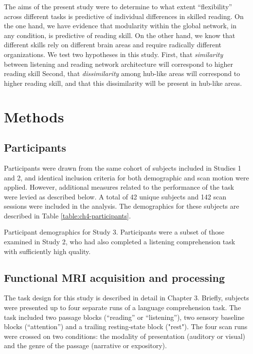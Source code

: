 The aims of the present study were to determine to what extent ``flexibility'' across different tasks is predictive of individual differences in skilled reading. On the one hand, we have evidence that modularity within the global network, in any condition, is predictive of reading skill. On the other hand, we know that different skills rely on different brain areas and require radically different organizations. We test two hypotheses in this study. First, that \textit{similarity} between listening and reading network architecture will correspond to higher reading skill Second, that \textit{dissimilarity} among hub-like areas will correspond to higher reading skill, and that this dissimilarity will be present in hub-like areas. 


\section{Methods}

\subsection{Participants}

Participants were drawn from the same cohort of subjects included in Studies 1 and 2, and identical inclusion criteria for both demographic and scan motion were applied. However, additional measures related to the performance of the task were levied as described below. A total of 42 unique subjects and 142 scan sessions were included in the analysis. The demographics for these subjects are described in Table \ref{table:ch4-participants}.

\begin{table}[t]
	\renewcommand{\tabcolsep}{0.09cm}
	\centering
	
	\caption[Participant demographics for Study 3.]{Participant demographics for Study 3. Participants were a subset of those examined in Study 2, who had also completed a listening comprehension task with sufficiently high quality.}
	\label{table:ch4-participants}
\end{table}

\subsection{Functional MRI acquisition and processing}

The task design for this study is described in detail in Chapter 3. Briefly, subjects were presented up to four separate runs of a language comprehension task. The task included two passage blocks (``reading'' or ``listening''), two sensory baseline blocks (``attention'') and a trailing resting-state block ("rest"). The four scan runs were crossed on two conditions: the modality of presentation (auditory or visual) and the genre of the passage (narrative or expository). 

